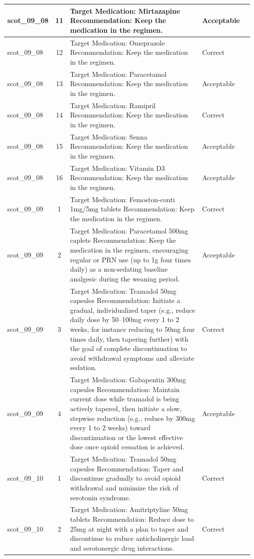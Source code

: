 \begin{longtable}{|p{1.45cm}|c|p{10.2cm}|p{1.55cm}|p{2.3cm}|}
\hline
scot\_09\_08 & 11 & Target Medication: Mirtazapine Recommendation: Keep the medication in the regimen. & Acceptable &  \\
\hline
scot\_09\_08 & 12 & Target Medication: Omeprazole Recommendation: Keep the medication in the regimen. & Correct &  \\
\hline
scot\_09\_08 & 13 & Target Medication: Paracetamol Recommendation: Keep the medication in the regimen. & Acceptable &  \\
\hline
scot\_09\_08 & 14 & Target Medication: Ramipril Recommendation: Keep the medication in the regimen. & Correct &  \\
\hline
scot\_09\_08 & 15 & Target Medication: Senna Recommendation: Keep the medication in the regimen. & Acceptable &  \\
\hline
scot\_09\_08 & 16 & Target Medication: Vitamin D3 Recommendation: Keep the medication in the regimen. & Acceptable &  \\
\hline
scot\_09\_09 & 1 & Target Medication: Femoston-conti 1mg/5mg tablets Recommendation: Keep the medication in the regimen. & Correct &  \\
\hline
scot\_09\_09 & 2 & Target Medication: Paracetamol 500mg caplets Recommendation: Keep the medication in the regimen, encouraging regular or PRN use (up to 1g four times daily) as a non-sedating baseline analgesic during the weaning period. & Acceptable &  \\
\hline
scot\_09\_09 & 3 & Target Medication: Tramadol 50mg capsules Recommendation: Initiate a gradual, individualized taper (e.g., reduce daily dose by 50–100mg every 1 to 2 weeks, for instance reducing to 50mg four times daily, then tapering further) with the goal of complete discontinuation to avoid withdrawal symptoms and alleviate sedation. & Correct &  \\
\hline
scot\_09\_09 & 4 & Target Medication: Gabapentin 300mg capsules Recommendation: Maintain current dose while tramadol is being actively tapered, then initiate a slow, stepwise reduction (e.g., reduce by 300mg every 1 to 2 weeks) toward discontinuation or the lowest effective dose once opioid cessation is achieved. & Acceptable &  \\
\hline
scot\_09\_10 & 1 & Target Medication: Tramadol 50mg capsules Recommendation: Taper and discontinue gradually to avoid opioid withdrawal and minimize the risk of serotonin syndrome. & Correct &  \\
\hline
scot\_09\_10 & 2 & Target Medication: Amitriptyline 50mg tablets Recommendation: Reduce dose to 25mg at night with a plan to taper and discontinue to reduce anticholinergic load and serotonergic drug interactions. & Correct &  \\

\end{longtable}
